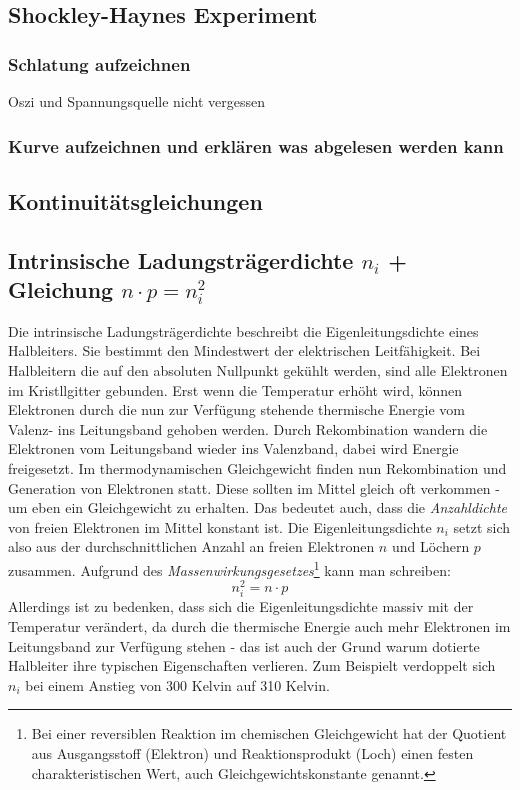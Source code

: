 \subsection{Shockley-Haynes Experiment }\label{k3:shockleyhaynes}
    \subsubsection{Schlatung aufzeichnen} Oszi und Spannungsquelle nicht vergessen
    \subsubsection{Kurve aufzeichnen und erkl\"aren was abgelesen werden kann}

\subsection{Kontinuit\"atsgleichungen }\label{k3:kontinuitaet}

	\subsection{Intrinsische Ladungsträgerdichte $n_i$ + Gleichung $n \cdot p=n_i^2$ }
	Die intrinsische Ladungsträgerdichte beschreibt die Eigenleitungsdichte eines Halbleiters. Sie bestimmt den Mindestwert der elektrischen Leitfähigkeit.  
	Bei Halbleitern die auf den absoluten Nullpunkt gekühlt werden, sind alle Elektronen im Kristllgitter gebunden. Erst wenn die Temperatur erhöht wird, können Elektronen durch die nun zur Verfügung stehende thermische Energie vom Valenz- ins Leitungsband gehoben werden.
	Durch Rekombination wandern die Elektronen vom Leitungsband wieder ins Valenzband, dabei wird Energie freigesetzt. 
	Im thermodynamischen Gleichgewicht finden nun Rekombination und Generation von Elektronen statt. Diese sollten im Mittel gleich oft verkommen - um eben ein Gleichgewicht zu erhalten.
	Das bedeutet auch, dass die \textit{Anzahldichte} von freien Elektronen im Mittel konstant ist. 
	Die Eigenleitungsdichte $n_i$ setzt sich also aus der durchschnittlichen Anzahl an freien Elektronen $n$ und Löchern $p$ zusammen. Aufgrund des \textit{Massenwirkungsgesetzes}\footnote{Bei einer reversiblen Reaktion im chemischen Gleichgewicht hat der Quotient aus Ausgangsstoff (Elektron) und Reaktionsprodukt (Loch) einen festen charakteristischen Wert, auch Gleichgewichtskonstante genannt.} kann man schreiben:
	\begin{equation}
	    n_i^2 = n \cdot p
	\end{equation}
	Allerdings ist zu bedenken, dass sich die Eigenleitungsdichte massiv mit der Temperatur verändert, da durch die thermische Energie auch mehr Elektronen im Leitungsband zur Verfügung stehen - das ist auch der Grund warum dotierte Halbleiter ihre typischen Eigenschaften verlieren.
	Zum Beispielt verdoppelt sich $n_i$ bei einem Anstieg von 300 Kelvin auf 310 Kelvin.
	
